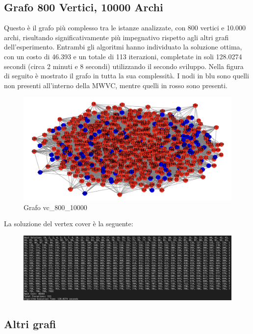 \documentclass[12pt,a4paper,twoside]{article}
\begin{document}
\subsection{Grafo 800 Vertici, 10000 Archi}
Questo è il grafo più complesso tra le istanze analizzate, con 800 vertici e 10.000 archi, risultando significativamente più impegnativo rispetto agli altri grafi dell'esperimento. Entrambi gli algoritmi hanno individuato la soluzione ottima, con un costo di 46.393 e un totale di 113 iterazioni, completate in soli 128.0274 secondi (circa 2 minuti e 8 secondi) utilizzando il secondo sviluppo. Nella figura di seguito è mostrato il grafo in tutta la sua complessità. I nodi in blu sono quelli non presenti all'interno della MWVC, mentre quelli in rosso sono presenti.
\begin{figure}[!h]
    \centering
    \includegraphics[width=0.8\linewidth]{Graph800-10000.png}
    \caption{Grafo vc\_800\_10000}
    \label{fig:enter-label}
\end{figure}
\newline
La soluzione del vertex cover è la seguente:
\begin{figure}[!h]
    \centering
    \includegraphics[width=0.8\linewidth]{BestSolution800-10000.png}
\end{figure}
\clearpage
\subsection{Altri grafi}
\end{document}

